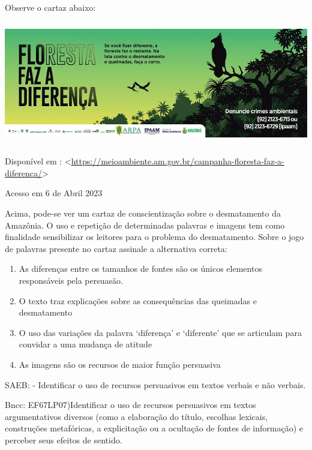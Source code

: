 Observe o cartaz abaixo:

\includegraphics[width=5.90551in,height=2.125in]{./imgSAEB_7_POR/media/image16.png}

Disponível em :
\textless{}\href{https://meioambiente.am.gov.br/campanha-floresta-faz-a-diferenca/}{\uline{https://meioambiente.am.gov.br/campanha-floresta-faz-a-diferenca/}}\textgreater{}

Acesso em 6 de Abril 2023

Acima, pode-se ver um cartaz de conscientização sobre o desmatamento da
Amazônia. O uso e repetição de determinadas palavras e imagens tem como
finalidade sensibilizar os leitores para o problema do desmatamento.
Sobre o jogo de palavras presente no cartaz assinale a alternativa
correta:

\begin{enumerate}
\def\labelenumi{\alph{enumi})}
\item
  As diferenças entre os tamanhos de fontes são os únicos elementos
  responsáveis pela persuasão.
\item
  O texto traz explicações sobre as consequências das queimadas e
  desmatamento
\item
  O uso das variações da palavra `diferença' e `diferente' que se
  articulam para convidar a uma mudança de atitude
\item
  As imagens são os recursos de maior função persuasiva
\end{enumerate}

SAEB: - Identificar o uso de recursos persuasivos em textos verbais e
não verbais.

Bncc: EF67LP07)Identificar o uso de recursos persuasivos em textos
argumentativos diversos (como a elaboração do título, escolhas lexicais,
construções metafóricas, a explicitação ou a ocultação de fontes de
informação) e perceber seus efeitos de sentido.

